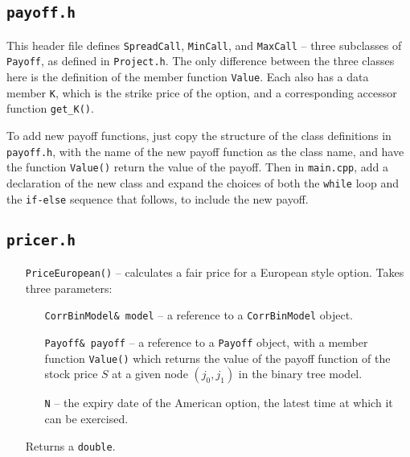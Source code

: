 \documentclass[12pt,a4paper]{article}
\begin{document}
\subsection{\texttt{payoff.h}}
This header file defines \texttt{SpreadCall}, \texttt{MinCall}, and 
\texttt{MaxCall} -- three subclasses of \texttt{Payoff}, as defined in 
\texttt{Project.h}. The only difference between the three classes here is the 
definition of the member function \texttt{Value}. Each also has a data member 
\texttt{K}, which is the strike price of the option, and a corresponding 
accessor function \texttt{get\_K()}.

To add new payoff functions, just copy the structure of the class definitions in 
\texttt{payoff.h}, with the name of the new payoff function as the class name, 
and have the function \texttt{Value()} return the value of the payoff. Then in 
\texttt{main.cpp}, add a declaration of the new class and expand the choices of 
both the \texttt{while} loop and the \texttt{if-else} sequence that follows, to 
include the new payoff.

\subsection{\texttt{pricer.h}}
\begin{itemize}
	\item[\texttt{PriceEuropean()}] -- calculates a fair price for a European style 
option. Takes three parameters: 
	\begin{itemize}
		\item[\texttt{CorrBinModel\& model}] -- a reference to a \texttt{CorrBinModel} 
object.
		\item[\texttt{Payoff\& payoff}] -- a reference to a \texttt{Payoff} object, 
with a 
		member function \texttt{Value()} which returns the value of the payoff 
function 
		of the stock price $S$ at a given node $(j_0,j_1)$ in the binary tree model.
		\item[\texttt{N}] -- the expiry date of the American option, the latest time 
at 
		which it can be exercised.
	\end{itemize}
	Returns a \texttt{double}.
\end{itemize}
\end{document}

